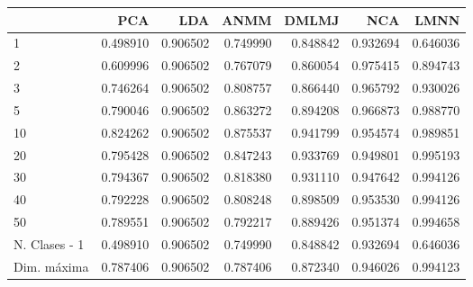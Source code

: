 \begin{tabular}{lrrrrrr}
\toprule
{} &       PCA &       LDA &      ANMM &     DMLMJ &       NCA &      LMNN \\
\midrule
1             &  0.498910 &  0.906502 &  0.749990 &  0.848842 &  0.932694 &  0.646036 \\
2             &  0.609996 &  0.906502 &  0.767079 &  0.860054 &  0.975415 &  0.894743 \\
3             &  0.746264 &  0.906502 &  0.808757 &  0.866440 &  0.965792 &  0.930026 \\
5             &  0.790046 &  0.906502 &  0.863272 &  0.894208 &  0.966873 &  0.988770 \\
10            &  0.824262 &  0.906502 &  0.875537 &  0.941799 &  0.954574 &  0.989851 \\
20            &  0.795428 &  0.906502 &  0.847243 &  0.933769 &  0.949801 &  0.995193 \\
30            &  0.794367 &  0.906502 &  0.818380 &  0.931110 &  0.947642 &  0.994126 \\
40            &  0.792228 &  0.906502 &  0.808248 &  0.898509 &  0.953530 &  0.994126 \\
50            &  0.789551 &  0.906502 &  0.792217 &  0.889426 &  0.951374 &  0.994658 \\
N. Clases - 1 &  0.498910 &  0.906502 &  0.749990 &  0.848842 &  0.932694 &  0.646036 \\
Dim. máxima   &  0.787406 &  0.906502 &  0.787406 &  0.872340 &  0.946026 &  0.994123 \\
\bottomrule
\end{tabular}
